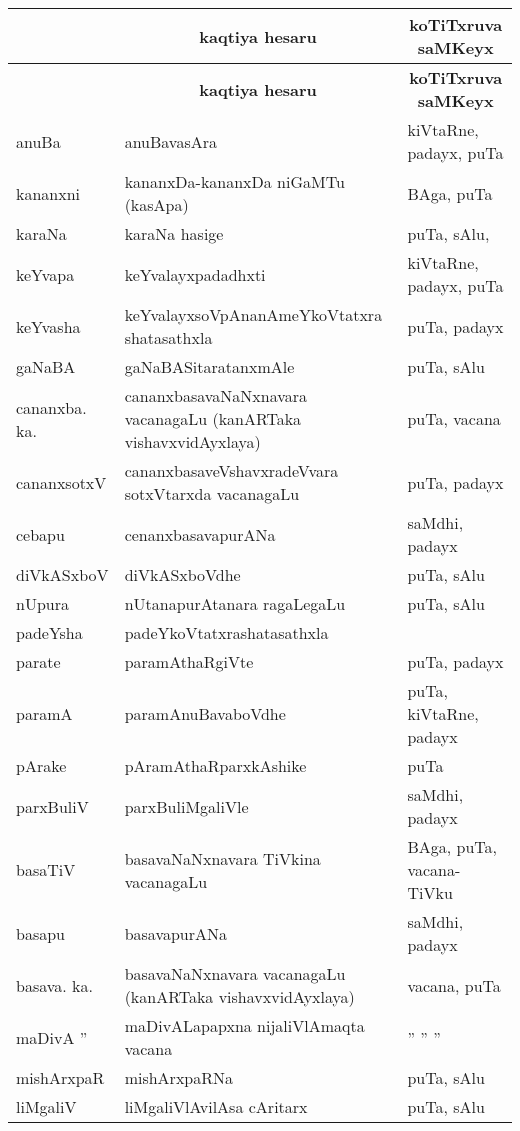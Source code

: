 {\renewcommand{\arraystretch}{1.3}
\begin{longtable}{>{\raggedright}p{3.5cm}ll}
\hline
\multicolumn{1}{c}{\bf saMkiSxpAtxkaSxra} & \multicolumn{1}{c}{\bf kaqtiya hesaru} & \multicolumn{1}{c}{\bf koTiTxruva saMKeyx}\\
\hline
\endfirsthead
\hline
\multicolumn{1}{c}{\bf saMkiSxpatx} & \multicolumn{1}{c}{\bf kaqtiya hesaru} & \multicolumn{1}{c}{\bf koTiTxruva saMKeyx}\\
\hline
\endhead
\hline
\endfoot
\endlastfoot
anuBa & anuBavasAra &  kiVtaRne, padayx, puTa\\
kananxni & kananxDa-kananxDa niGaMTu (kasApa) & BAga, puTa\\
karaNa & karaNa hasige & puTa, sAlu,\\
keYvapa & keYvalayxpadadhxti &  kiVtaRne, padayx, puTa\\
keYvasha & keYvalayxsoVpAnanAmeYkoVtatxra shatasathxla & puTa, padayx\\
gaNaBA & gaNaBASitaratanxmAle & puTa, sAlu\\
cananxba. ka. & cananxbasavaNaNxnavara vacanagaLu (kanARTaka vishavxvidAyxlaya) & puTa, vacana\\
cananxsotxV & cananxbasaveVshavxradeVvara sotxVtarxda vacanagaLu & puTa, padayx\\
cebapu & cenanxbasavapurANa & saMdhi, padayx\\
diVkASxboV & diVkASxboVdhe & puTa, sAlu\\
nUpura & nUtanapurAtanara ragaLegaLu & puTa, sAlu\\
padeYsha & padeYkoVtatxrashatasathxla & \\
parate & paramAthaRgiVte & puTa, padayx\\
paramA & paramAnuBavaboVdhe & puTa, kiVtaRne, padayx\\
pArake & pAramAthaRparxkAshike & puTa\\
parxBuliV & parxBuliMgaliVle & saMdhi, padayx\\
basaTiV & basavaNaNxnavara TiVkina vacanagaLu & BAga, puTa, vacana-TiVku\\
basapu & basavapurANa & saMdhi, padayx\\
basava. ka. & basavaNaNxnavara vacanagaLu (kanARTaka vishavxvidAyxlaya) & vacana, puTa\\
maDivA '' & maDivALapapxna nijaliVlAmaqta vacana & \qquad '' '' ''\\
mishArxpaR & mishArxpaRNa & puTa, sAlu\\
liMgaliV & liMgaliVlAvilAsa cAritarx & puTa, sAlu\\

\end{longtable}}
